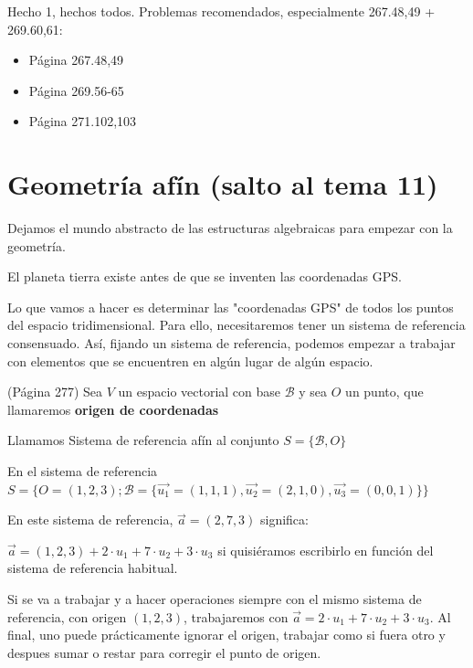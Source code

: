 Hecho 1, hechos todos. Problemas recomendados, especialmente 267.48,49 + 269.60,61: 
\begin{itemize}
  \item Página 267.48,49
  \item Página 269.56-65
  \item Página 271.102,103
\end{itemize}

\section{Geometría afín (salto al tema 11)}

Dejamos el mundo abstracto de las estructuras algebraicas para empezar con la geometría. 

El planeta tierra existe antes de que se inventen las coordenadas GPS. 


Lo que vamos a hacer es determinar las "coordenadas GPS" de todos los puntos del espacio tridimensional.
%
Para ello, necesitaremos tener un sistema de referencia consensuado.
%
Así, fijando un sistema de referencia, podemos empezar a trabajar con elementos que se encuentren en algún lugar de algún espacio. 



\begin{defn} (Página 277)
Sea $V$ un espacio vectorial con base $\mathcal{B}$ y sea $O$ un punto, que llamaremos \textbf{origen de coordenadas}

Llamamos Sistema de referencia afín al conjunto $S = \{\mathcal{B},O\}$
\end{defn}

\begin{example}
En el sistema de referencia $S=\{O = (1,2,3); \mathcal{B} = \{\vec{u_1} = (1,1,1), \vec{u_2} = (2,1,0), \vec{u_3} = (0,0,1)\}\}$

En este sistema de referencia, $\vec{a} = (2,7,3)$ significa:

$\vec{a} =  (1,2,3) + 2\cdot u_1 + 7\cdot u_2 + 3\cdot u_3$ si quisiéramos escribirlo en función del sistema de referencia habitual.

\label{example::origen_ref}

Si se va a trabajar y a hacer operaciones siempre con el mismo sistema de referencia, con origen $(1,2,3)$, trabajaremos con $\vec{a} = 2\cdot u_1 + 7\cdot u_2 + 3\cdot u_3$.
%
Al final, uno puede prácticamente ignorar el origen, trabajar como si fuera otro y despues sumar o restar para corregir el punto de origen.

\end{example}

